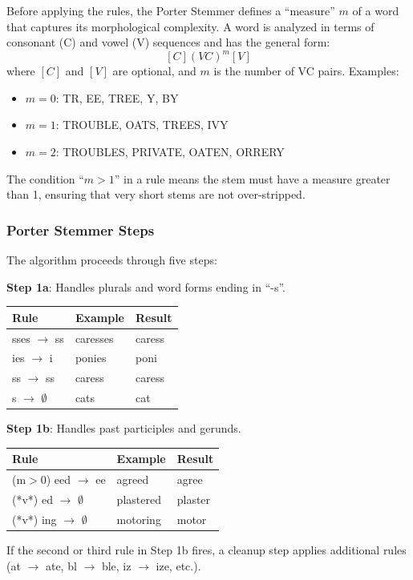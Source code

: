 \documentclass[11pt,a4paper]{article}
\begin{document}
Before applying the rules, the Porter Stemmer defines a ``measure'' $m$ of a word that captures its morphological complexity. A word is analyzed in terms of consonant (C) and vowel (V) sequences and has the general form:
\[
[C](VC)^m[V]
\]
where $[C]$ and $[V]$ are optional, and $m$ is the number of VC pairs. Examples:
\begin{itemize}
    \item $m = 0$: TR, EE, TREE, Y, BY
    \item $m = 1$: TROUBLE, OATS, TREES, IVY
    \item $m = 2$: TROUBLES, PRIVATE, OATEN, ORRERY
\end{itemize}

The condition ``$m > 1$'' in a rule means the stem must have a measure greater than 1, ensuring that very short stems are not over-stripped.

\subsubsection{Porter Stemmer Steps}

The algorithm proceeds through five steps:

\textbf{Step 1a}: Handles plurals and word forms ending in ``-s''.
\begin{center}
\begin{tabular}{|l|l|l|}
\hline
\textbf{Rule} & \textbf{Example} & \textbf{Result} \\ \hline
sses $\to$ ss & caresses & caress \\ \hline
ies $\to$ i & ponies & poni \\ \hline
ss $\to$ ss & caress & caress \\ \hline
s $\to$ $\emptyset$ & cats & cat \\ \hline
\end{tabular}
\end{center}

\textbf{Step 1b}: Handles past participles and gerunds.
\begin{center}
\begin{tabular}{|l|l|l|}
\hline
\textbf{Rule} & \textbf{Example} & \textbf{Result} \\ \hline
(m$>$0) eed $\to$ ee & agreed & agree \\ \hline
(*v*) ed $\to$ $\emptyset$ & plastered & plaster \\ \hline
(*v*) ing $\to$ $\emptyset$ & motoring & motor \\ \hline
\end{tabular}
\end{center}
If the second or third rule in Step 1b fires, a cleanup step applies additional rules (at $\to$ ate, bl $\to$ ble, iz $\to$ ize, etc.).
\end{document}
